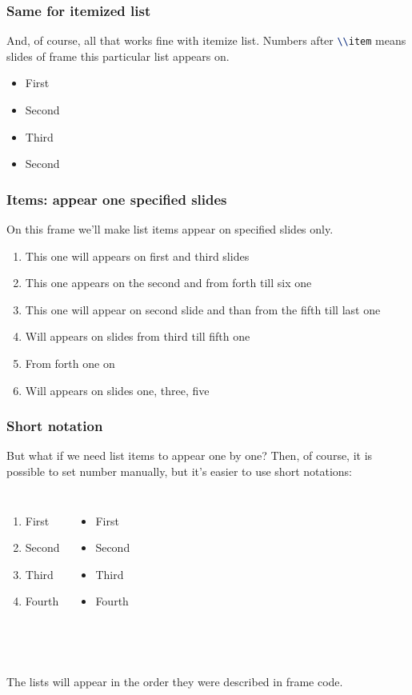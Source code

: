 \begin{frame}
    \frametitle{Same for itemized list}
    And, of course, all that works fine with itemize list. Numbers after \lstinline[language=tex]{\\item} means slides of frame this particular list appears on.
    \begin{itemize}
	\item<1-> First
	\item<2-> Second
	\item<3-> Third
	\item<2-> Second
    \end{itemize}
\end{frame}

\begin{frame}
    \frametitle{Items: appear one specified slides}
    On this frame we'll make list items appear on specified slides only. 
    \begin{enumerate}
	\item<1,3> This one will appears on first and third slides
	\item<2,4-6> This one appears on the second and from forth till six one
	\item<2,5-> This one will appear on second slide and than from the fifth till last one
	\item<3-5> Will appears on slides from third till fifth one
	\item<4-> From forth one on
	\item<1,3,5> Will appears on slides one, three, five
    \end{enumerate}
\end{frame}

\begin{frame}
    \frametitle{Short notation}
    But what if we need list items to appear one by one? Then, of course, it is possible to set number manually, but it's easier to use short notations:
    \begin{columns}
	\begin{enumerate}
	    \item<+-> First
	    \item<+-> Second
	    \item<+-> Third
	    \item<+-> Fourth
        \end{enumerate}
        \begin{itemize}[<+->]
	    \item First
	    \item Second
	    \item Third
	    \item Fourth
        \end{itemize}
    \end{columns}

    ~\\~\\The lists will appear in the order they were described in frame code.
\end{frame}

